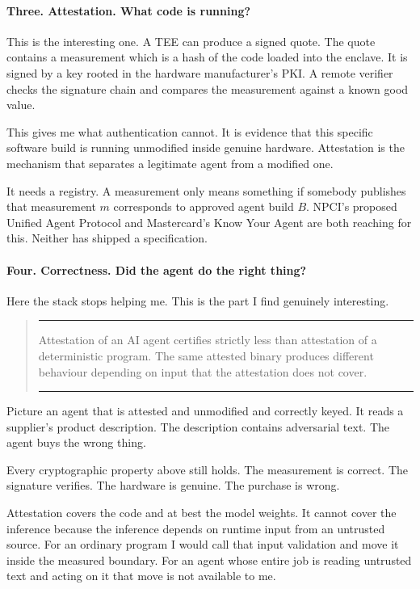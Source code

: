 \documentclass[journal,onecolumn,11pt]{IEEEtran}
\newenvironment{keybox}
  {\begin{quote}\color{accent}\rule{\linewidth}{0.8pt}\vspace{-0.4em}\begin{itshape}}
  {\end{itshape}\vspace{-0.2em}\rule{\linewidth}{0.8pt}\end{quote}}
\begin{document}
\paragraph{Three. Attestation. What code is running?}
This is the interesting one. A TEE can produce a signed quote. The quote contains a
measurement which is a hash of the code loaded into the enclave. It is signed by a key
rooted in the hardware manufacturer's PKI. A remote verifier checks the signature chain
and compares the measurement against a known good value.

This gives me what authentication cannot. It is evidence that this specific software
build is running unmodified inside genuine hardware. Attestation is the mechanism that
separates a legitimate agent from a modified one.

It needs a registry. A measurement only means something if somebody publishes that
measurement $m$ corresponds to approved agent build $B$. NPCI's proposed Unified Agent
Protocol and Mastercard's Know Your Agent are both reaching for this. Neither has
shipped a specification.

\paragraph{Four. Correctness. Did the agent do the right thing?}
Here the stack stops helping me. This is the part I find genuinely interesting.

\begin{keybox}
Attestation of an AI agent certifies strictly less than attestation of a deterministic
program. The same attested binary produces different behaviour depending on input that
the attestation does not cover.
\end{keybox}

Picture an agent that is attested and unmodified and correctly keyed. It reads a
supplier's product description. The description contains adversarial text. The agent buys
the wrong thing.

Every cryptographic property above still holds. The measurement is correct. The signature
verifies. The hardware is genuine. The purchase is wrong.

Attestation covers the code and at best the model weights. It cannot cover the inference
because the inference depends on runtime input from an untrusted source. For an ordinary
program I would call that input validation and move it inside the measured boundary. For
an agent whose entire job is reading untrusted text and acting on it that move is not
available to me.
\end{document}
